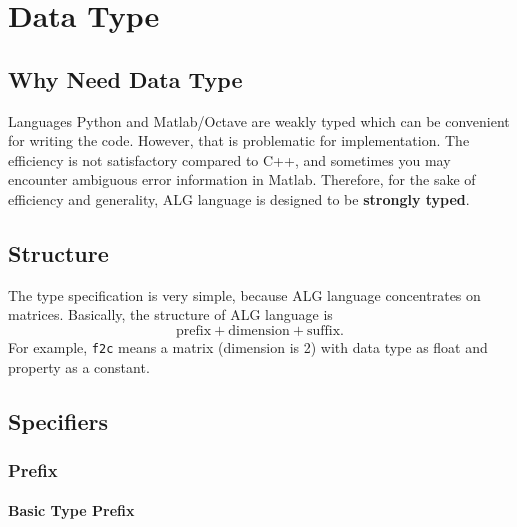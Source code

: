 \section{Data Type}

\subsection{Why Need Data Type}
Languages Python and Matlab/Octave are weakly typed
which can be convenient for writing the code.
However, that is problematic for implementation.
The efficiency is not satisfactory compared to C++,
and sometimes you may encounter ambiguous error information in Matlab.
Therefore, for the sake of efficiency and generality,
ALG language is designed to be \textbf{strongly typed}.

\subsection{Structure}
The type specification is very simple,
because ALG language concentrates on matrices.
Basically, the structure of ALG language is
\[
  \text{prefix}+\text{dimension}+\text{suffix}.
\]
For example, \texttt{f2c} means a matrix (dimension is 2) with data type as float
and property as a constant.

\subsection{Specifiers}

\subsubsection{Prefix}

\paragraph{Basic Type Prefix}


